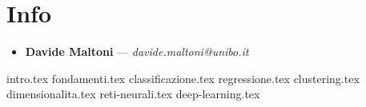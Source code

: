 \documentclass[12pt, a4paper]{scrreprt}
\begin{document}
\makefront{}

\begingroup
    \hypersetup{linkbordercolor=white, linkcolor=black} 
    \tableofcontents

    \newpage
\endgroup

\chapter{Info}\label{chap:info} %
\begin{itemize}
    \item \textbf{Davide Maltoni} --- \textit{davide.maltoni@unibo.it}
\end{itemize}
%
{intro.tex}
%
{fondamenti.tex}
%
{classificazione.tex}
%
{regressione.tex}
%
{clustering.tex}
%
{dimensionalita.tex}
%
{reti-neurali.tex}
%
{deep-learning.tex}
%
\end{document}
